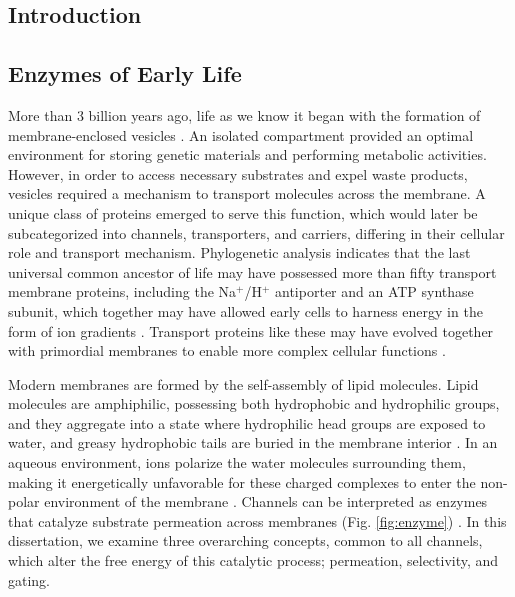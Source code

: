  \begin{refsection}
 \chapter{Introduction}


\section{Enzymes of Early Life}

More than 3 billion years ago, life as we know it began with the formation of membrane-enclosed vesicles \cite{Hille:2001tw,Schopf:2006cx}. An isolated compartment provided an optimal environment for storing genetic materials and performing metabolic activities. However, in order to access necessary substrates and expel waste products, vesicles required a mechanism to transport molecules across the membrane. A unique class of proteins emerged to serve this function, which would later be subcategorized into channels, transporters, and carriers, differing in their cellular role and transport mechanism. Phylogenetic analysis indicates that the last universal common ancestor of life may have possessed more than fifty transport membrane proteins, including the Na$^+$/H$^+$ antiporter and an ATP synthase subunit, which together may have allowed early cells to harness energy in the form of ion gradients \cite{Lane:2012ds,Weiss:2016ie}. Transport proteins like these may have evolved together with primordial membranes to enable more complex cellular functions \cite{Mulkidjanian:2009ko}.

Modern membranes are formed by the self-assembly of lipid molecules. Lipid molecules are amphiphilic, possessing both hydrophobic and hydrophilic groups, and they aggregate into a state where hydrophilic head groups are exposed to water, and greasy hydrophobic tails are buried in the membrane interior \cite{Tanford:1978uu}. In an aqueous environment, ions polarize the water molecules surrounding them, making it energetically unfavorable for these charged complexes to enter the non-polar environment of the membrane \cite{Hauser:1973ul,Paula:1996dn}. Channels can be interpreted as enzymes that catalyze substrate permeation across membranes (Fig. \ref{fig:enzyme}) \cite{Latorre:1983wk,Andersen:1992tf}. In this dissertation, we examine three overarching concepts, common to all channels, which alter the free energy of this catalytic process; permeation, selectivity, and gating.


\end{refsection}
